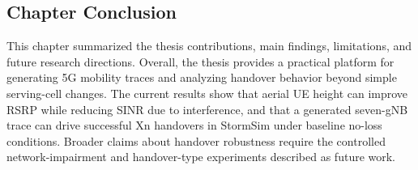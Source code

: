 \subsection{Chapter Conclusion}

This chapter summarized the thesis contributions, main findings, limitations, and future research directions. Overall, the thesis provides a practical platform for generating 5G mobility traces and analyzing handover behavior beyond simple serving-cell changes. The current results show that aerial UE height can improve RSRP while reducing SINR due to interference, and that a generated seven-gNB trace can drive successful Xn handovers in StormSim under baseline no-loss conditions. Broader claims about handover robustness require the controlled network-impairment and handover-type experiments described as future work.
